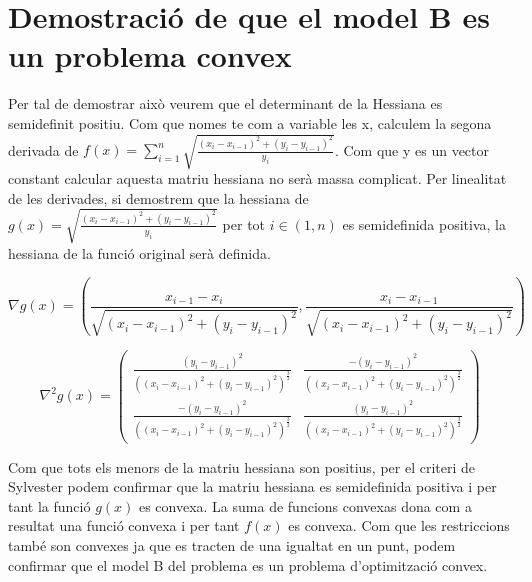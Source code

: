 \documentclass[12pt, a4papre]{article}
\begin{document}
	\newpage
	\section{Demostració de que el model B es un problema convex}
	
	Per tal de demostrar això veurem que el determinant de la Hessiana es semidefinit positiu. Com que nomes te com a variable les x, calculem la segona derivada de $f(x) = \sum_{i = 1}^n \sqrt{\frac{(x_i - x_{i - 1})^2 + (y_i - y_{i - 1})^2} {y_i}}$. Com que y es un vector constant calcular aquesta matriu hessiana no serà massa complicat. Per linealitat de les derivades, si demostrem que la hessiana de $g(x) =  \sqrt{\frac{(x_i - x_{i - 1})^2 + (y_i - y_{i - 1})^2} {y_i}}$ per tot $i \in (1, n)$ es semidefinida positiva, la hessiana de la funció original serà definida.
	
	\[
	\nabla g(x) =(\frac{x_{i - 1} - x_{i}}{\sqrt{(x_{i} - x_{i - 1})^2 + (y_i - y_{i - 1})^2}}, \frac{x_{i} - x_{i - 1}}{\sqrt{(x_{i} - x_{i - 1})^2 + (y_i - y_{i -1})^2}})
	\]
	
	\[
	\nabla^2 g(x) = 
	\begin{pmatrix}
	\frac{(y_{i} - y_{i - 1})^2}{((x_{i} - x_{i - 1})^2 + (y_i - y_{i - 1})^2)^{\frac{3}{2}}}	& \frac{-(y_{i} - y_{i - 1})^2}{((x_{i} - x_{i - 1})^2 + (y_i - y_{i - 1})^2)^{\frac{3}{2}}}\\
	\frac{-(y_{i} - y_{i - 1})^2}{((x_{i} - x_{i - 1})^2 + (y_i - y_{i - 1})^2)^{\frac{3}{2}}}	& \frac{(y_{i} - y_{i - 1})^2}{((x_{i} - x_{i - 1})^2 + (y_i - y_{i - 1})^2)^{\frac{3}{2}}}
	\end{pmatrix}
	\]
	
	Com que tots els menors de la matriu hessiana son positius, per el criteri de Sylvester podem confirmar que la matriu hessiana es semidefinida positiva i per tant la funció $g(x)$ es convexa. La suma de funcions convexas dona com a resultat una funció convexa i per tant $f(x)$ es convexa. Com que les restriccions també son convexes ja que es tracten de una igualtat en un punt, podem confirmar que el model B del problema es un problema d'optimització convex.
\end{document}
